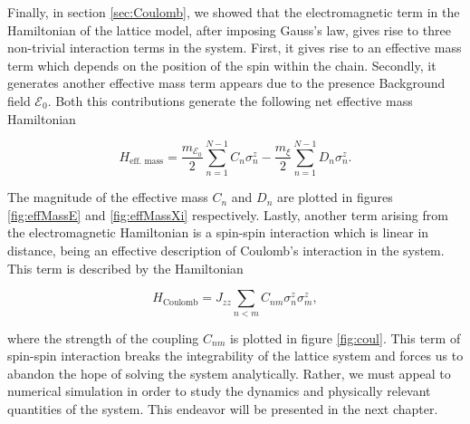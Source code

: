 Finally, in section \ref{sec:Coulomb}, we showed that the electromagnetic term in the Hamiltonian of the lattice model, after imposing Gauss's law, gives rise to three non-trivial interaction terms in the system. First, it gives rise to an effective mass term which depends on the position of the spin within the chain. Secondly, it generates another effective mass term appears due to the presence Background field $\mathcal{E}_0$. Both this contributions generate the following net effective mass Hamiltonian


\begin{equation*}
	H_{\text{eff. mass}} = \frac{m_{\mathcal{E}_0}}{2}\sum_{n=1}^{N-1}C_n\sigma^z_n - \frac{m_\xi}{2} \sum_{n=1}^{N-1} D_n \sigma^z_n.
\end{equation*}

The magnitude of the effective mass $C_n$ and $D_n$ are plotted in figures \ref{fig:effMassE} and \ref{fig:effMassXi} respectively. Lastly, another term arising from the electromagnetic Hamiltonian is a spin-spin interaction which is linear in distance, being an effective description of Coulomb's interaction in the system. This term is described by the Hamiltonian

\begin{equation*}
	H_{\text{Coulomb}} = J_{zz} \sum_{n<m}C_{nm}\sigma^z_n\sigma^z_m, 
\end{equation*}

where the strength of the coupling $C_{nm}$ is plotted in figure \ref{fig:coul}. This term of spin-spin interaction breaks the integrability of the lattice system and forces us to abandon the hope of solving the system analytically. Rather, we must appeal to numerical simulation in order to study the dynamics and physically relevant quantities of the system. This endeavor will be presented in the next chapter.
